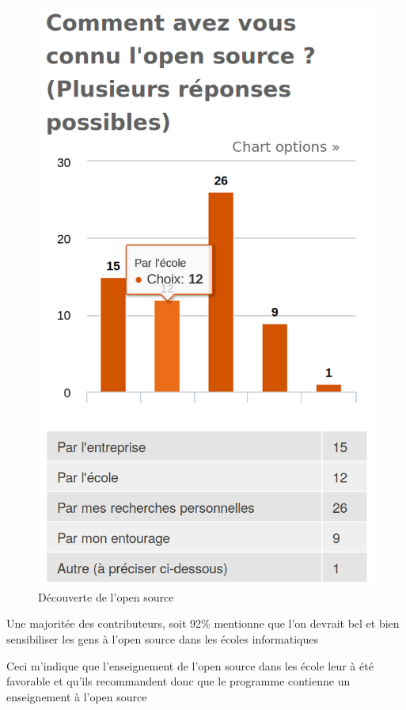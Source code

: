			\begin{figure}[!htb]
				\center
				\includegraphics[scale=0.28]{./img/a3}
				\caption{Découverte de l'open source}
			\end{figure}

			\newpage

			Une majoritée des contributeurs, soit 92\% mentionne que l'on devrait bel et bien sensibiliser les gens à l'open source dans les écoles informatiques

			Ceci m'indique que l'enseignement de l'open source dans les école leur à été favorable et qu'ils recommandent donc que le programme contienne un enseignement à l'open source

